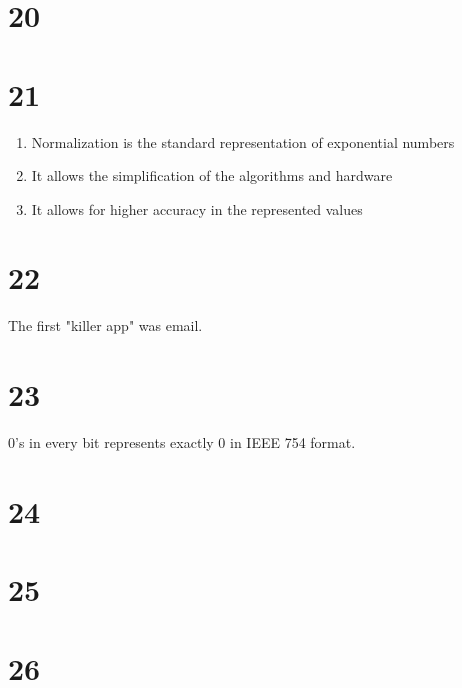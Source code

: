 \documentclass[a4paper,11pt]{article}
\begin{document}

\section*{20}


\section*{21}

\begin{enumerate}
  \item Normalization is the standard representation of exponential numbers
  \item It allows the simplification of the algorithms and hardware
  \item It allows for higher accuracy in the represented values
\end{enumerate}


\section*{22}
The first "killer app" was email.

\section*{23}
0's in every bit represents exactly 0 in IEEE 754 format.


\section*{24}


\section*{25}


\section*{26}
\end{document}
